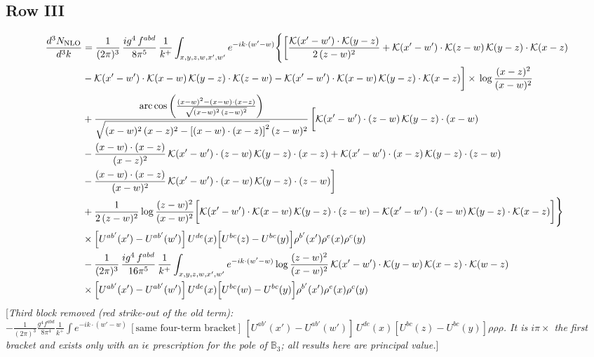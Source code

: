\documentclass[9pt]{article}
\def\mf#1{\mathbb{#1}}
\newcommand{\rnote}[1]{{\color{teal}[\textit{#1}]}}
\numberwithin{equation}{section}
\begin{document}
\subsection{Row III}
\begin{align}
\frac{d^{3}N_{\rm NLO}}{d^{3}k} &=\frac{1}{(2\pi)^{3}}\,\frac{ig^{4}\,f^{abd}}{8\pi^{5}}\,\frac{1}{k^{+}}\int_{x,y,z,w,x',w'}e^{-ik\cdot(w'-w)}\Bigg\{\bigg[\frac{\mathcal{K}(x'-w')\cdot\mathcal{K}(y-z)}{2\,(z-w)^{2}}+\mathcal{K}(x'-w')\cdot\mathcal{K}(z-w)\,\mathcal{K}(y-z)\cdot\mathcal{K}(x-z)\notag \\
&-\mathcal{K}(x'-w')\cdot\mathcal{K}(x-w)\,\mathcal{K}(y-z)\cdot\mathcal{K}(z-w)-\mathcal{K}(x'-w')\cdot\mathcal{K}(x-w)\,\mathcal{K}(y-z)\cdot\mathcal{K}(x-z)\bigg]\times\, \log\frac{(x-z)^{2}}{(x-w)^{2}}\notag \\
&+\frac{\mathrm{arc\,cos}\left(\frac{(x-w)^{2}-(x-w)\cdot (x-z)}{\sqrt{(x-w)^{2}\,(z-w)^{2}}}\right)}{\sqrt{(x-w)^{2}\,(x-z)^{2}-\left[(x-w)\cdot (x-z)\right]^{2}}\,(z-w)^{2}}\,\bigg[\mathcal{K}(x'-w')\cdot(z-w)\,\mathcal{K}(y-z)\cdot(x-w)\notag \\ & -\frac{(x-w)\cdot(x-z)}{(x-z)^{2}}\,\mathcal{K}(x'-w')\cdot(z-w)\,\mathcal{K}(y-z)\cdot(x-z)+\mathcal{K}(x'-w')\cdot(x-z)\,\mathcal{K}(y-z)\cdot(z-w)\notag \\ & -\frac{(x-w)\cdot(x-z)}{(x-w)^{2}}\,\mathcal{K}(x'-w')\cdot(x-w)\,\mathcal{K}(y-z)\cdot(z-w)\bigg]\notag \\
&+\frac{1}{2\,(z-w)^{2}}\log\frac{(z-w)^{2}}{(x-w)^{2}}\bigg[\mathcal{K}(x'-w')\cdot\mathcal{K}(x-w)\,\mathcal{K}(y-z)\cdot(z-w)-\mathcal{K}(x'-w')\cdot(z-w)\,\mathcal{K}(y-z)\cdot\mathcal{K}(x-z)\bigg]\Bigg\}\notag\\
&\times\Big[U^{ab'}(x')-U^{ab'}(w')\Big]\,U^{de}(x)\Big[U^{bc}(z)-U^{bc}(y)\Big]\rho^{b'}(x')\rho^{e}(x)\rho^{c}(y)\notag\\
&-\frac{1}{(2\pi)^{3}}\,\frac{ig^{4}\,f^{abd}}{16\pi^{5}}\,\frac{1}{k^{+}}\int_{x,y,z,w,x',w'}e^{-ik\cdot(w'-w)}\log\frac{(z-w)^{2}}{(x-w)^{2}}\,\mathcal{K}(x'-w')\cdot\mathcal{K}(y-w)\,\mathcal{K}(x-z)\cdot\mathcal{K}(w-z)\notag\\
&\times\Big[U^{ab'}(x')-U^{ab'}(w')\Big]\,U^{de}(x)\Big[U^{bc}(w)-U^{bc}(y)\Big]\rho^{b'}(x')\rho^{e}(x)\rho^{c}(y)
\end{align}
\rnote{Third block removed (red strike-out of the old term): $-\frac{1}{(2\pi)^{3}}\frac{g^{4}f^{abd}}{8\pi^{4}}\frac{1}{k^{+}}\int e^{-ik\cdot(w'-w)}\,[\text{same four-term bracket}]\,[U^{ab'}(x')-U^{ab'}(w')]\,U^{de}(x)[U^{bc}(z)-U^{bc}(y)]\rho\rho\rho$. It is $i\pi\times$ the first bracket and exists only with an $i\epsilon$ prescription for the pole of $\mf{B}_{3}$; all results here are principal value.}
\end{document}
